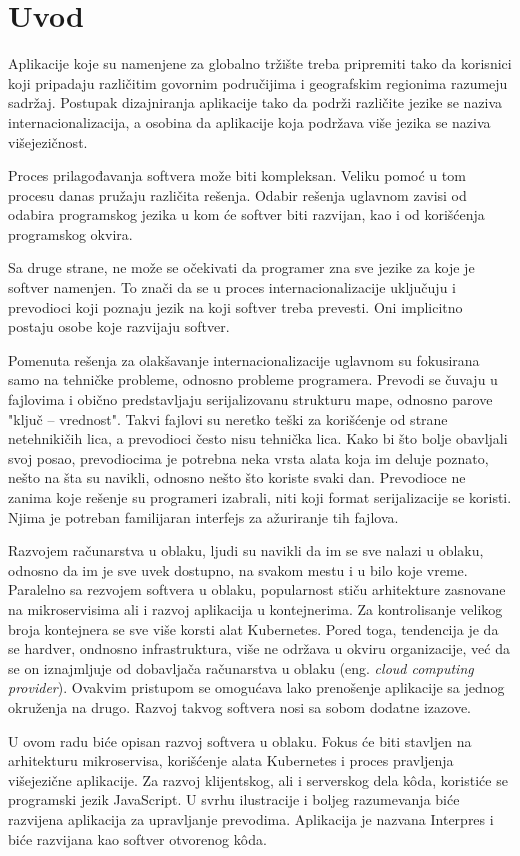 \chapter{Uvod}\label{ch:uvod}

Aplikacije koje su namenjene za globalno tržište treba pripremiti 
tako da korisnici koji pripadaju različitim govornim područijima i 
geografskim regionima razumeju sadržaj. Postupak dizajniranja aplikacije 
tako da podrži različite jezike se naziva internacionalizacija, a osobina 
da aplikacije koja podržava više jezika se naziva višejezičnost. 

Proces prilagođavanja softvera može biti kompleksan. Veliku pomoć u tom procesu
danas pružaju različita rešenja. Odabir rešenja uglavnom zavisi od odabira 
programskog jezika u kom će softver biti razvijan, kao i od korišćenja 
programskog okvira.

Sa druge strane, ne može se očekivati da programer zna sve jezike za koje je 
softver namenjen. To znači da se u proces internacionalizacije uključuju i 
prevodioci koji poznaju jezik na koji softver treba prevesti. Oni implicitno 
postaju osobe koje razvijaju softver.

Pomenuta rešenja za olakšavanje internacionalizacije uglavnom su fokusirana
samo na tehničke probleme, odnosno probleme programera. Prevodi se čuvaju u
fajlovima i obično predstavljaju serijalizovanu strukturu mape, odnosno parove
"ključ -- vrednost". Takvi fajlovi su neretko teški za korišćenje od strane
netehnikičih lica, a prevodioci često nisu tehnička lica. Kako bi što bolje 
obavljali svoj posao, prevodiocima je potrebna neka vrsta alata koja im deluje
poznato, nešto na šta su navikli, odnosno nešto što koriste svaki dan. 
Prevodioce ne zanima koje rešenje su programeri izabrali, niti koji format 
serijalizacije se koristi. Njima je potreban familijaran interfejs za ažuriranje
tih fajlova.

Razvojem računarstva u oblaku, ljudi su navikli da im se sve nalazi u oblaku, 
odnosno da im je sve uvek dostupno, na svakom mestu i u bilo koje vreme. 
Paralelno sa rezvojem softvera u oblaku, popularnost stiču arhitekture zasnovane
na mikroservisima ali i razvoj aplikacija u kontejnerima. Za kontrolisanje 
velikog broja kontejnera se sve više korsti alat Kubernetes. Pored toga, 
tendencija je da se hardver, ondnosno infrastruktura, više ne održava u okviru
organizacije, već da se on iznajmljuje od dobavljača računarstva u oblaku 
(eng. \textit{cloud computing provider}). Ovakvim pristupom se omogućava lako 
prenošenje aplikacije sa jednog okruženja na drugo. Razvoj takvog softvera nosi
sa sobom dodatne izazove. 

U ovom radu biće opisan razvoj softvera u oblaku. Fokus će biti stavljen na 
arhitekturu mikroservisa, korišćenje alata Kubernetes i proces pravljenja 
višejezične aplikacije. Za razvoj klijentskog, ali i serverskog dela 
kôda, koristiće se programski jezik JavaScript. U svrhu ilustracije i
boljeg razumevanja biće razvijena aplikacija za upravljanje prevodima. 
Aplikacija je nazvana Interpres i biće razvijana kao softver otvorenog kôda.
